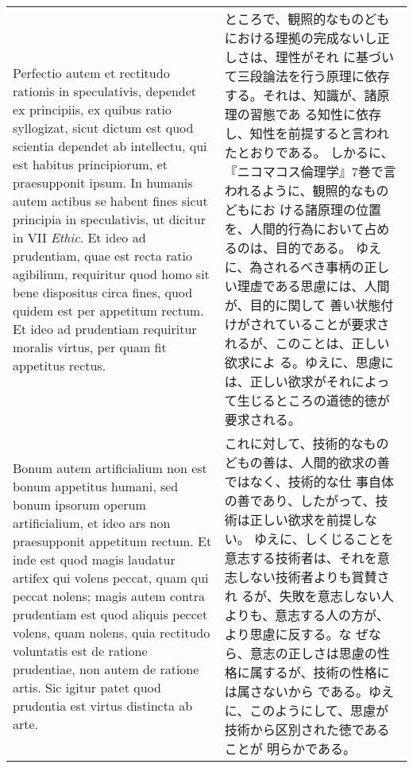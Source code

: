 \documentclass[10pt]{jsarticle} %
\begin{document}
\begin{longtable}{p{21em}p{21em}}
\\




Perfectio autem et rectitudo rationis in speculativis, dependet ex
 principiis, ex quibus ratio syllogizat, sicut dictum est quod scientia
 dependet ab intellectu, qui est habitus principiorum, et praesupponit
 ipsum. In humanis autem actibus se habent fines sicut principia in
 speculativis, ut dicitur in VII {\itshape Ethic}. Et ideo ad
 prudentiam, quae est recta ratio agibilium, requiritur quod homo sit
 bene dispositus circa fines, quod quidem est per appetitum rectum. Et
 ideo ad prudentiam requiritur moralis virtus, per quam fit appetitus
 rectus.

& ところで、観照的なものどもにおける理拠の完成ないし正しさは、理性がそれ
に基づいて三段論法を行う原理に依存する。それは、知識が、諸原理の習態であ
る知性に依存し、知性を前提すると言われたとおりである。
しかるに、『ニコマコス倫理学』7巻で言われるように、観照的なものどもにお
 ける諸原理の位置を、人間的行為において占めるのは、目的である。
ゆえに、為されるべき事柄の正しい理虚である思慮には、人間が、目的に関して
 善い状態付けがされていることが要求されるが、このことは、正しい欲求によ
 る。ゆえに、思慮には、正しい欲求がそれによって生じるところの道徳的徳が
 要求される。

\\



Bonum autem artificialium non est bonum appetitus humani, sed
 bonum ipsorum operum artificialium, et ideo ars non praesupponit
 appetitum rectum. Et inde est quod magis laudatur artifex qui volens
 peccat, quam qui peccat nolens; magis autem contra prudentiam est quod
 aliquis peccet volens, quam nolens, quia rectitudo voluntatis est de
 ratione prudentiae, non autem de ratione artis. Sic igitur patet quod
 prudentia est virtus distincta ab arte.


&

これに対して、技術的なものどもの善は、人間的欲求の善ではなく、技術的な仕
 事自体の善であり、したがって、技術は正しい欲求を前提しない。
ゆえに、しくじることを意志する技術者は、それを意志しない技術者よりも賞賛され
 るが、失敗を意志しない人よりも、意志する人の方が、より思慮に反する。な
 ぜなら、意志の正しさは思慮の性格に属するが、技術の性格には属さないから
 である。ゆえに、このようにして、思慮が技術から区別された徳であることが
 明らかである。


\\




\end{longtable}
\end{document}
